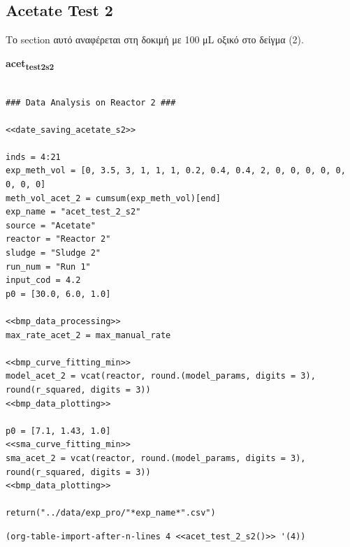 \documentclass[11pt]{article}
\begin{document}
\subsection{Acetate Test 2}
\label{sec:org76d0ff1}
Το section αυτό αναφέρεται στη δοκιμή με 100 μL οξικό στο δείγμα (2).

\textbf{acet\textsubscript{test}\textsubscript{2}\textsubscript{s2}}
\begin{verbatim}

### Data Analysis on Reactor 2 ###

<<date_saving_acetate_s2>>

inds = 4:21
exp_meth_vol = [0, 3.5, 3, 1, 1, 1, 0.2, 0.4, 0.4, 2, 0, 0, 0, 0, 0, 0, 0, 0]
meth_vol_acet_2 = cumsum(exp_meth_vol)[end]
exp_name = "acet_test_2_s2"
source = "Acetate"
reactor = "Reactor 2"
sludge = "Sludge 2"
run_num = "Run 1"
input_cod = 4.2
p0 = [30.0, 6.0, 1.0]

<<bmp_data_processing>>
max_rate_acet_2 = max_manual_rate

<<bmp_curve_fitting_min>>
model_acet_2 = vcat(reactor, round.(model_params, digits = 3), round(r_squared, digits = 3))
<<bmp_data_plotting>>

p0 = [7.1, 1.43, 1.0]
<<sma_curve_fitting_min>>
sma_acet_2 = vcat(reactor, round.(model_params, digits = 3), round(r_squared, digits = 3))  
<<bmp_data_plotting>>

return("../data/exp_pro/"*exp_name*".csv")
\end{verbatim}

\begin{verbatim}
(org-table-import-after-n-lines 4 <<acet_test_2_s2()>> '(4))
\end{verbatim}
\end{document}
